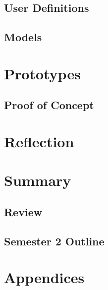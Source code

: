 \documentclass{article}
\begin{document}
\subsection{User Definitions}



\subsection{Models}



\section{Prototypes}



\subsection{Proof of Concept}



\section{Reflection}



\section{Summary}



\subsection{Review}



\subsection{Semester 2 Outline}



\section{Appendices}




\end{document}
